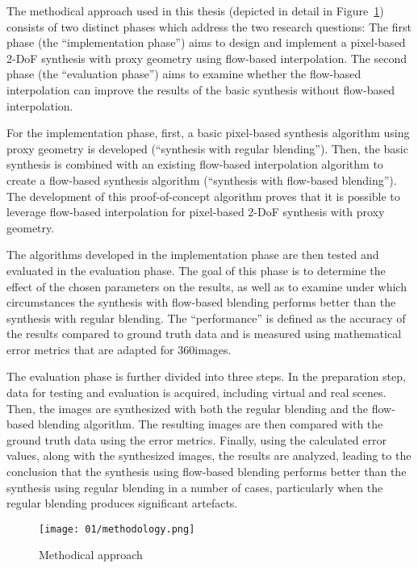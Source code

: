 The methodical approach used in this thesis (depicted in detail in Figure~\ref{fig:methodology}) consists of two distinct phases which address the two research questions: The first phase (the ``implementation phase'') aims to design and implement a pixel-based 2-DoF synthesis with proxy geometry using flow-based interpolation. The second phase (the ``evaluation phase'') aims to examine whether the flow-based interpolation can improve the results of the basic synthesis without flow-based interpolation.

For the implementation phase, first, a basic pixel-based synthesis algorithm using proxy geometry is developed (``synthesis with regular blending''). Then, the basic synthesis is combined with an existing flow-based interpolation algorithm to create a flow-based synthesis algorithm (``synthesis with flow-based blending''). The development of this proof-of-concept algorithm proves that it is possible to leverage flow-based interpolation for pixel-based 2-DoF synthesis with proxy geometry.

The algorithms developed in the implementation phase are then tested and evaluated in the evaluation phase. The goal of this phase is to determine the effect of the chosen parameters on the results, as well as to examine under which circumstances the synthesis with flow-based blending performs better than the synthesis with regular blending. The ``performance'' is defined as the accuracy of the results compared to ground truth data and is measured using mathematical error metrics that are adapted for 360\degree images.

The evaluation phase is further divided into three steps. In the preparation step, data for testing and evaluation is acquired, including virtual and real scenes. Then, the images are synthesized with both the regular blending and the flow-based blending algorithm. The resulting images are then compared with the ground truth data using the error metrics. 
Finally, using the calculated error values, along with the synthesized images, the results are analyzed, leading to the conclusion that the synthesis using flow-based blending performs better than the synthesis using regular blending in a number of cases, particularly when the regular blending produces significant artefacts.

\begin{figure}
		\centering
		\texttt{[image: 01/methodology.png]}
		\caption{Methodical approach}
		\label{fig:methodology}
\end{figure}


